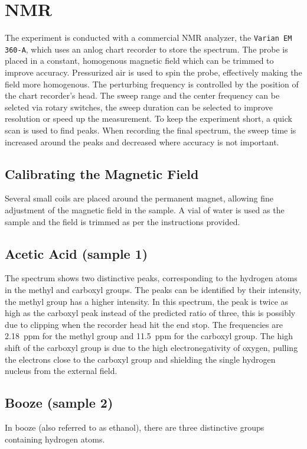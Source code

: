 \chapter{NMR}
The experiment is conducted with a commercial NMR analyzer, the \texttt{Varian EM 360-A}, which uses an anlog chart recorder to store the spectrum.
The probe is placed in a constant, homogenous magnetic field which can be trimmed to improve accuracy.
Pressurized air is used to spin the probe, effectively making the field more homogenous. %
The perturbing frequency is controlled by the position of the chart recorder's head.
The sweep range and the center frequency can be selcted via rotary switches, the sweep duration can be selected to improve resolution or speed up the measurement.
To keep the experiment short, a quick scan is used to find peaks.
When recording the final spectrum, the sweep time is increased around the peaks and decreased where accuracy is not important.

\section{Calibrating the Magnetic Field}
Several small coils are placed around the permanent magnet, allowing fine adjustment of the magnetic field in the sample.
A vial of water is used as the sample and the field is trimmed as per the instructions provided.


\section{Acetic Acid (sample 1)}
The spectrum shows two distinctive peaks, corresponding to the hydrogen atoms in the methyl and carboxyl groups.
The peaks can be identified by their intensity, the methyl group has a higher intensity.
In this spectrum, the peak is twice as high as the carboxyl peak instead of the predicted ratio of three, this is possibly due to clipping when the recorder head hit the end stop.
The frequencies are \SI{2.18}{ppm} for the methyl group and \SI{11.5}{ppm} for the carboxyl group.
The high shift of the carboxyl group is due to the high electronegativity of oxygen, pulling the electrons close to the carboxyl group and shielding the single hydrogen nucleus from the external field.

\section{Booze (sample 2)}
In booze (also referred to as ethanol), there are three distinctive groups containing hydrogen atoms.

